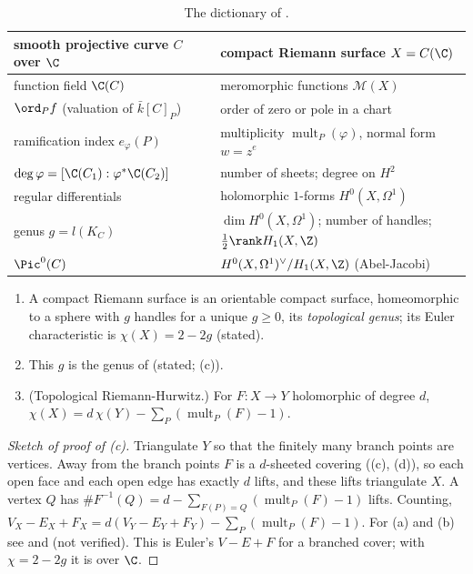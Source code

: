 \begin{table}[ht]
\centering
\small
\begin{tabular}{@{}p{}p{}@{}}
\toprule
smooth projective curve $C$ over $\C$ & compact Riemann surface $X=C(\C)$ \\
\midrule
function field $\C(C)$ & meromorphic functions $\mathcal M(X)$ \\
$\ord_Pf$ (valuation of $\bar k[C]_P$) & order of zero or pole in a chart \\
ramification index $e_\varphi(P)$ & multiplicity $\operatorname{mult}_P(\varphi)$, normal form $w=z^e$ \\
$\deg\varphi=[\C(C_1):\varphi^*\C(C_2)]$ & number of sheets; degree on $H^2$ \\
regular differentials & holomorphic $1$-forms $H^0(X,\Omega^1)$ \\
genus $g=l(K_C)$ & $\dim H^0(X,\Omega^1)$; number of handles; $\frac12\rank H_1(X,\Z)$ \\
$\Pic^0(C)$ & $H^0(X,\Omega^1)^\vee/H_1(X,\Z)$ (Abel-Jacobi) \\
\bottomrule
\end{tabular}
\caption{The dictionary of .}\label{tab:curves:dictionary}
\end{table}

\begin{theorem}\label{thm:curves:topology}
\leavevmode
\begin{enumerate}[label=(\alph*)]
\item A compact Riemann surface is an orientable compact surface, homeomorphic to a sphere with $g$ handles for a unique $g\ge0$, its \emph{topological genus};
its Euler characteristic is $\chi(X)=2-2g$ (stated).
\item This $g$ is the genus of  (stated; (c)).
\item (Topological Riemann-Hurwitz.) For $F\colon X\to Y$ holomorphic of degree $d$, $\chi(X)=d\,\chi(Y)-\sum_P(\operatorname{mult}_P(F)-1)$.
\end{enumerate}
\end{theorem}

\begin{proof}[Sketch of proof of (c)]
Triangulate $Y$ so that the finitely many branch points are vertices. Away from the branch points $F$ is a $d$-sheeted covering
((c), (d)), so each open face and each open edge has exactly $d$ lifts, and these lifts triangulate $X$. A vertex $Q$ has
$\#F^{-1}(Q)=d-\sum_{F(P)=Q}(\operatorname{mult}_P(F)-1)$ lifts. Counting, $V_X-E_X+F_X=d(V_Y-E_Y+F_Y)-\sum_P(\operatorname{mult}_P(F)-1)$. For (a) and (b) see
\cite[Chapters I and II]{Miranda} and \cite[Section 17]{Forster81} (not verified). This is Euler's $V-E+F$ for a branched cover; with $\chi=2-2g$ it is
 over $\C$.
\end{proof}

